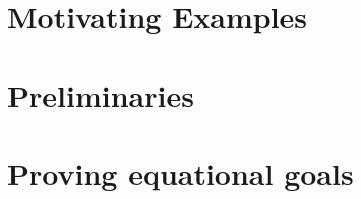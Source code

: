 \documentclass[conference]{IEEEtran}
\theoremstyle{definition}
\begin{document}



	\section{Motivating Examples}
	\label{sec:motivating}
	

	\section{Preliminaries}
	\label{sec:preliminaries}
	

	\section{Proving equational goals}
	\label{sec:equations}
	
\end{document}
